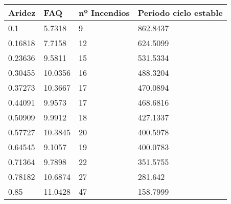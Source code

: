 \begin{tabular}{llll}
Aridez & FAQ & nº Incendios & Periodo ciclo estable \\ 
\hline 
0.1 & 5.7318 & 9 & 862.8437 \\ 
0.16818 & 7.7158 & 12 & 624.5099 \\ 
0.23636 & 9.5811 & 15 & 531.5334 \\ 
0.30455 & 10.0356 & 16 & 488.3204 \\ 
0.37273 & 10.3667 & 17 & 470.0894 \\ 
0.44091 & 9.9573 & 17 & 468.6816 \\ 
0.50909 & 9.9912 & 18 & 427.1337 \\ 
0.57727 & 10.3845 & 20 & 400.5978 \\ 
0.64545 & 9.1057 & 19 & 400.0783 \\ 
0.71364 & 9.7898 & 22 & 351.5755 \\ 
0.78182 & 10.6874 & 27 & 281.642 \\ 
0.85 & 11.0428 & 47 & 158.7999 \\ 
\hline 
\end{tabular}